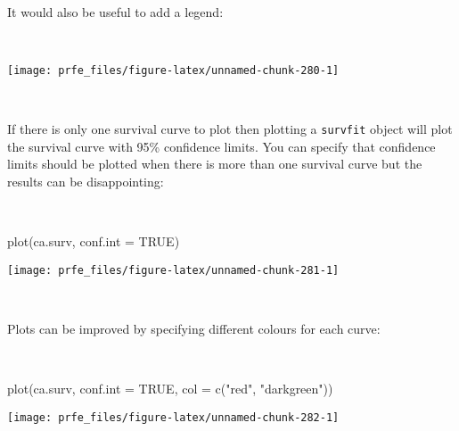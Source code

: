 \documentclass[
  12pt,
  a4paper]{book}
\newenvironment{Shaded}{\begin{snugshade}}{\end{snugshade}}
\newcommand{\AttributeTok}[1]{\textcolor[rgb]{0.77,0.63,0.00}{#1}}
\newcommand{\ConstantTok}[1]{\textcolor[rgb]{0.00,0.00,0.00}{#1}}
\newcommand{\DecValTok}[1]{\textcolor[rgb]{0.00,0.00,0.81}{#1}}
\newcommand{\FunctionTok}[1]{\textcolor[rgb]{0.00,0.00,0.00}{#1}}
\newcommand{\NormalTok}[1]{#1}
\newcommand{\SpecialCharTok}[1]{\textcolor[rgb]{0.00,0.00,0.00}{#1}}
\newcommand{\StringTok}[1]{\textcolor[rgb]{0.31,0.60,0.02}{#1}}
\begin{document}
~

It would also be useful to add a legend:

~

\begin{Shaded}
\end{Shaded}

\begin{center}\texttt{[image: prfe\_files/figure-latex/unnamed-chunk-280-1]} \end{center}

~

If there is only one survival curve to plot then plotting a \texttt{survfit} object will plot the survival curve with 95\% confidence limits. You can specify that confidence limits should be plotted when there is more than one survival curve but the results can be disappointing:

~

\begin{Shaded}
\begin{Highlighting}[]
\FunctionTok{plot}\NormalTok{(ca.surv, }\AttributeTok{conf.int =} \ConstantTok{TRUE}\NormalTok{)}
\end{Highlighting}
\end{Shaded}

\begin{center}\texttt{[image: prfe\_files/figure-latex/unnamed-chunk-281-1]} \end{center}

~

Plots can be improved by specifying different colours for each curve:

~

\begin{Shaded}
\begin{Highlighting}[]
\FunctionTok{plot}\NormalTok{(ca.surv, }\AttributeTok{conf.int =} \ConstantTok{TRUE}\NormalTok{, }\AttributeTok{col =} \FunctionTok{c}\NormalTok{(}\StringTok{"red"}\NormalTok{, }\StringTok{"darkgreen"}\NormalTok{))}
\end{Highlighting}
\end{Shaded}

\begin{center}\texttt{[image: prfe\_files/figure-latex/unnamed-chunk-282-1]} \end{center}
\end{document}
